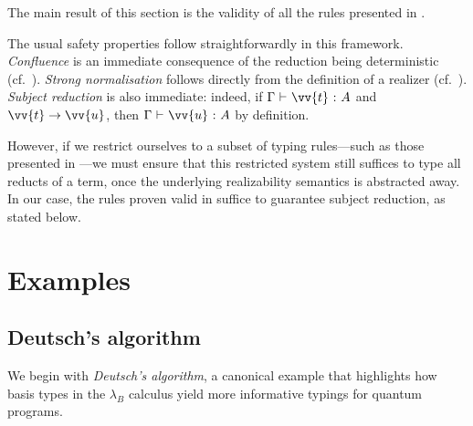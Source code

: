 \documentclass[runningheads,orivec,envcountsame,envcountsect]{llncs}
\providecommand{\qed}{\hbox{\rule{1ex}{1ex}}}%
\newcommand\ansubst[2]{\ensuremath{\langle #1 \rangle_{#2}}}
\def\TYP#1#2#3{#1~{\vdash}~#2~{:}~#3}
\newcommand{\lambdaB}{\lambda_B}
\begin{document}
The main result of this section is the validity of all the rules presented in
.



The usual safety properties follow straightforwardly in this framework.
\emph{Confluence} is an immediate consequence of the reduction being
deterministic (cf.~).  
\emph{Strong normalisation} follows directly from the definition of a
realizer (cf.~).  
\emph{Subject reduction} is also immediate: indeed, if
$\TYP{\Gamma}{\vv{t}}{A}$ and $\vv{t}\to\vv{u}$, then
$\TYP{\Gamma}{\vv{u}}{A}$ by definition.

However, if we restrict ourselves to a subset of typing rules—such as those
presented in —we must
ensure that this restricted system still suffices to type all reducts of a
term, once the underlying realizability semantics is abstracted away.  In our
case, the rules proven valid in 
suffice to guarantee subject reduction, as
stated below.



\section{Examples}\label{sec:examples}
\subsection{Deutsch's algorithm}\label{subsec:deutsch}
We begin with \emph{Deutsch's algorithm}, a canonical example that highlights
how basis types in the $\lambdaB$ calculus yield more informative typings for
quantum programs.
\end{document}
